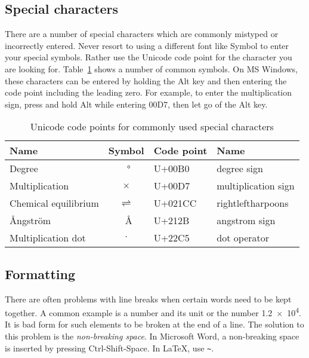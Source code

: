 \documentclass[a4paper,12pt]{article}
\begin{document}
\subsection{Special characters}
There are a number of special characters which are commonly mistyped
or incorrectly entered.  Never resort to using a different font like
Symbol to enter your special symbols.  Rather use the Unicode code
point for the character you are looking for.
Table~\ref{tab:specialchar} shows a number of common symbols.  On MS
Windows, these characters can be entered by holding the Alt key and
then entering the code point including the leading zero.  For example,
to enter the multiplication sign, press and hold Alt while entering
00D7, then let go of the Alt key.
\begin{table}[htbp]
  \centering
  \caption{Unicode code points for commonly used special characters}
  \label{tab:specialchar}
  \begin{tabular}{lcll}
    \toprule
    Name                                                                                                  & Symbol               & Code point & Name                \\ 
    \midrule
    Degree                                                                                                & \SI{}{\degree}       & U+00B0     & degree sign         \\ 
    Multiplication                                                                                        & $\times$             & U+00D7     & multiplication sign \\
    Chemical equilibrium                                                                                  & $\rightleftharpoons$ & U+021CC    & rightleftharpoons   \\
    \AA ngstr\"om                                                                                         & \SI{}{\angstrom}     & U+212B     & angstrom sign       \\
    Multiplication dot                                                                                    & $\cdot$              & U+22C5     & dot operator        \\
    \bottomrule
  \end{tabular}
\end{table}

\subsection{Formatting}
\label{sec:tips-formatting}
There are often problems with line breaks when certain words need to
be kept together.  A common example is a number and its unit or the
number \num{1.2e4}.  It is bad form for such elements to be broken at
the end of a line.  The solution to this problem is the
\emph{non-breaking space}.  In Microsoft Word, a non-breaking space is
inserted by pressing Ctrl-Shift-Space.  In \LaTeX, use \verb|~|.
\end{document}
